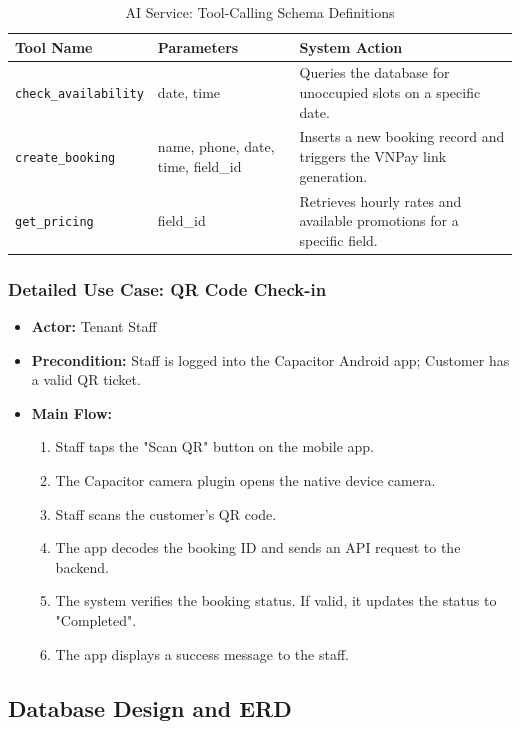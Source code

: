 \begin{table}[htbp]
\centering
\begin{tabularx}{\textwidth}{|l|l|X|}
\hline
\rowcolor{LightCyan}
\textbf{Tool Name} & \textbf{Parameters} & \textbf{System Action} \\ \hline
\texttt{check\_availability} & date, time & Queries the database for unoccupied slots on a specific date. \\ \hline
\texttt{create\_booking} & name, phone, date, time, field\_id & Inserts a new booking record and triggers the VNPay link generation. \\ \hline
\texttt{get\_pricing} & field\_id & Retrieves hourly rates and available promotions for a specific field. \\ \hline
\end{tabularx}
\caption{AI Service: Tool-Calling Schema Definitions}
\label{tab:ai_tools}
\end{table}

\subsubsection{Detailed Use Case: QR Code Check-in}
\begin{itemize}
    \item \textbf{Actor:} Tenant Staff
    \item \textbf{Precondition:} Staff is logged into the Capacitor Android app; Customer has a valid QR ticket.
    \item \textbf{Main Flow:}
    \begin{enumerate}
        \item Staff taps the "Scan QR" button on the mobile app.
        \item The Capacitor camera plugin opens the native device camera.
        \item Staff scans the customer's QR code.
        \item The app decodes the booking ID and sends an API request to the backend.
        \item The system verifies the booking status. If valid, it updates the status to "Completed".
        \item The app displays a success message to the staff.
    \end{enumerate}
\end{itemize}

\subsection{Database Design and ERD}

